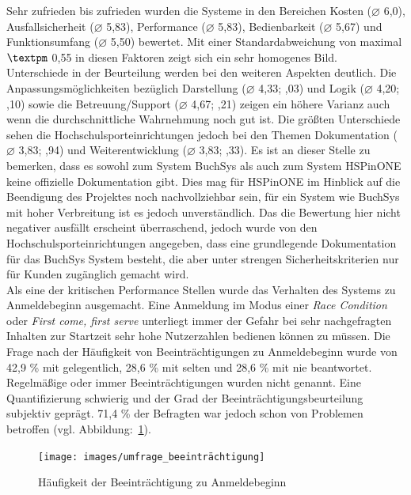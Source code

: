 Sehr zufrieden bis zufrieden wurden die Systeme in den Bereichen Kosten ($\varnothing$ 6,0), Ausfallsicherheit ($\varnothing$ 5,83), Performance ($\varnothing$ 5,83), Bedienbarkeit ($\varnothing$ 5,67) und Funktionsumfang ($\varnothing$ 5,50) bewertet. Mit einer Standardabweichung von maximal $\textpm$ 0,55 in diesen Faktoren zeigt sich ein sehr homogenes Bild.
\\
Unterschiede in der Beurteilung werden bei den weiteren Aspekten deutlich. Die Anpassungsmöglichkeiten bezüglich Darstellung ($\varnothing$ 4,33; ,03) und Logik ($\varnothing$ 4,20; ,10) sowie die Betreuung/Support ($\varnothing$ 4,67; ,21) zeigen ein höhere Varianz auch wenn die durchschnittliche Wahrnehmung noch gut ist. Die größten Unterschiede sehen die Hochschulsporteinrichtungen jedoch bei den Themen Dokumentation ($\varnothing$ 3,83; ,94) und Weiterentwicklung ($\varnothing$ 3,83; ,33). Es ist an dieser Stelle zu bemerken, dass es sowohl zum System BuchSys als auch zum System HSPinONE keine offizielle Dokumentation gibt. Dies mag für HSPinONE im Hinblick auf die Beendigung des Projektes noch nachvollziehbar sein, für ein System wie BuchSys mit hoher Verbreitung ist es jedoch unverständlich. Das die Bewertung hier nicht negativer ausfällt erscheint überraschend, jedoch wurde von den Hochschulsporteinrichtungen angegeben, dass eine grundlegende Dokumentation für das BuchSys System besteht, die aber unter strengen Sicherheitskriterien nur für Kunden zugänglich gemacht wird.
\\
Als eine der kritischen Performance Stellen wurde das Verhalten des Systems zu Anmeldebeginn ausgemacht. Eine Anmeldung im Modus einer \textit{Race Condition} oder \textit{First come, first serve} unterliegt immer der Gefahr bei sehr nachgefragten Inhalten zur Startzeit sehr hohe Nutzerzahlen bedienen können zu müssen. Die Frage nach der Häufigkeit von Beeinträchtigungen zu Anmeldebeginn wurde von 42,9 \% mit gelegentlich, 28,6 \% mit selten und 28,6 \% mit nie beantwortet. Regelmäßige oder immer Beeinträchtigungen wurden nicht genannt. Eine Quantifizierung schwierig und der Grad der Beeinträchtigungsbeurteilung subjektiv geprägt. 71,4 \% der Befragten war jedoch schon von Problemen betroffen (vgl. Abbildung:~\ref{fig:Umfrage_beeinträchtigung}).
	\begin{figure}[h]
		\centering
		\texttt{[image: images/umfrage\_beeinträchtigung]}
		\caption{Häufigkeit der Beeinträchtigung zu Anmeldebeginn}
		\label{fig:Umfrage_beeinträchtigung}
	\end{figure}

